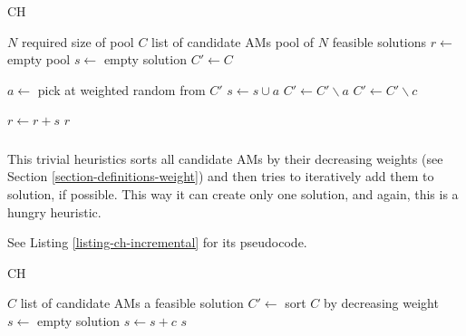 \begin{algorithm}
\caption{ CH}
\label{listing-ch-fuzzy}
\begin{algorithmic}
\REQUIRE $N$ required size of pool
\REQUIRE $C$ list of candidate AMs
\ENSURE pool of $N$ feasible solutions
\STATE $r \gets $ empty pool
  \STATE {}
  \STATE $s \gets $ empty solution
  \STATE $C' \gets C$

    \STATE $a \gets $ pick at weighted random from $C'$
      \STATE $s \gets s \cup a$
      \STATE $C' \gets C' \backslash a$
    \ENDIF
        \STATE {}
        \STATE $C' \gets C' \backslash c$
      \ENDIF
    \ENDFOR
  \ENDWHILE

  \STATE $r \gets r + s$
\ENDFOR
\RETURN $r$
\end{algorithmic}
\end{algorithm}

\subsubsection{}

This trivial heuristics sorts all candidate AMs by their decreasing weights (see Section \ref{section-definitions-weight}) and then tries to iteratively add them to solution, if possible. This way it can create only one solution, and again, this is a hungry heuristic.

See Listing \ref{listing-ch-incremental} for its pseudocode.

\begin{algorithm}
\caption{ CH}
\label{listing-ch-incremental}
\begin{algorithmic}
\REQUIRE $C$ list of candidate AMs
\ENSURE a feasible solution
\STATE $C' \gets $ sort $C$ by decreasing weight
\STATE $s \gets $ empty solution
    \STATE $s \gets s + c$
  \ENDIF
\ENDFOR
\RETURN $s$
\end{algorithmic}
\end{algorithm}

\subsubsection{}

